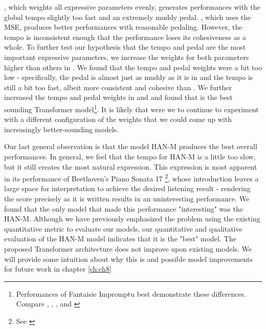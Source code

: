 , which weights all expressive parameters evenly, generates performances with the global tempo slightly too fast and an extremely muddy pedal. , which uses the \vnet{} MSE, produces better performances with reasonable pedaling. However, the tempo is inconsistent enough that the performance loses its cohesiveness as a whole. To further test our hypothesis that the tempo and pedal are the most important expressive parameters, we increase the weights for both parameters higher than others in . We found that the tempo and pedal weights  were a bit too low - specifically, the pedal is almost just as muddy as it is in  and the tempo is still a bit too fast, albeit more consistent and cohesive than . We further increased the tempo and pedal weights in  and  and found that  is the best sounding Transformer model\footnote{Performances of Fantaisie Impromptu best demonstrate these differences. Compare \href{https://ui.neptune.ai/richt3211/thesis/e/THESIS-154/artifacts}{}, \href{https://ui.neptune.ai/richt3211/thesis/e/THESIS-150/artifacts}{}, \href{https://ui.neptune.ai/richt3211/thesis/e/THESIS-156/artifacts}{}, and \href{https://ui.neptune.ai/richt3211/thesis/e/THESIS-157/artifacts}{} }. It is likely that were we to continue to experiment with a different configuration of the weights that we could come up with increasingly better-sounding models. 

Our last general observation is that the \vnet{} model HAN-M produces the best overall performances. In general, we feel that the tempo for HAN-M is a little too slow, but it still creates the most natural expression. This expression is most apparent in its performance of Beethoven's Piano Sonata 17%
\footnote{See \href{https://ui.neptune.ai/richt3211/thesis/e/THESIS-162/artifacts}{}}, whose introduction leaves a large space for interpretation to achieve the desired listening result - rendering the score precisely as it is written results in an uninteresting performance. We found that the only model that made this performance "interesting" was the HAN-M. Although we have previously emphasized the problem using the existing quantitative metric to evaluate our models, our quantitative and qualitative evaluation of the HAN-M model indicates that it is the "best" model. The proposed Transformer architecture does not improve upon existing models. We will provide some intuition about why this is and possible model improvements for future work in chapter \ref{ch:ch8}





